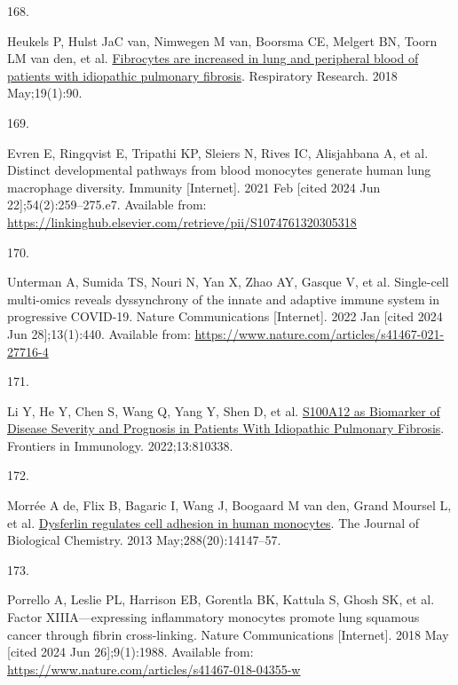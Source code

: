 \documentclass[
]{article}
\newlength{\cslhangindent}
\newlength{\csllabelwidth}
\newenvironment{CSLReferences}[2] %
 {\begin{list}{}{%
  \setlength{\itemindent}{0pt}
  \setlength{\leftmargin}{0pt}
  \setlength{\parsep}{0pt}
  \ifodd #1
   \setlength{\leftmargin}{\cslhangindent}
   \setlength{\itemindent}{-1\cslhangindent}
  \fi
  \setlength{\itemsep}{#2\baselineskip}}}
 {\end{list}}
\newcommand{\CSLLeftMargin}[1]{\parbox[t]{\csllabelwidth}{\strut#1\strut}}
\newcommand{\CSLRightInline}[1]{\parbox[t]{\linewidth - \csllabelwidth}{\strut#1\strut}}
\begin{document}
\begin{CSLReferences}{0}{1}
\CSLLeftMargin{168. }%
\CSLRightInline{Heukels P, Hulst JaC van, Nimwegen M van, Boorsma CE, Melgert BN, Toorn LM van den, et al. \href{https://doi.org/10.1186/s12931-018-0798-8}{Fibrocytes are increased in lung and peripheral blood of patients with idiopathic pulmonary fibrosis}. Respiratory Research. 2018 May;19(1):90. }

\CSLLeftMargin{169. }%
\CSLRightInline{Evren E, Ringqvist E, Tripathi KP, Sleiers N, Rives IC, Alisjahbana A, et al. Distinct developmental pathways from blood monocytes generate human lung macrophage diversity. Immunity {[}Internet{]}. 2021 Feb {[}cited 2024 Jun 22{]};54(2):259--275.e7. Available from: \url{https://linkinghub.elsevier.com/retrieve/pii/S1074761320305318}}

\CSLLeftMargin{170. }%
\CSLRightInline{Unterman A, Sumida TS, Nouri N, Yan X, Zhao AY, Gasque V, et al. Single-cell multi-omics reveals dyssynchrony of the innate and adaptive immune system in progressive {COVID}-19. Nature Communications {[}Internet{]}. 2022 Jan {[}cited 2024 Jun 28{]};13(1):440. Available from: \url{https://www.nature.com/articles/s41467-021-27716-4}}

\CSLLeftMargin{171. }%
\CSLRightInline{Li Y, He Y, Chen S, Wang Q, Yang Y, Shen D, et al. \href{https://doi.org/10.3389/fimmu.2022.810338}{{S100A12} as {Biomarker} of {Disease} {Severity} and {Prognosis} in {Patients} {With} {Idiopathic} {Pulmonary} {Fibrosis}}. Frontiers in Immunology. 2022;13:810338. }

\CSLLeftMargin{172. }%
\CSLRightInline{Morrée A de, Flix B, Bagaric I, Wang J, Boogaard M van den, Grand Moursel L, et al. \href{https://doi.org/10.1074/jbc.M112.448589}{Dysferlin regulates cell adhesion in human monocytes}. The Journal of Biological Chemistry. 2013 May;288(20):14147--57. }

\CSLLeftMargin{173. }%
\CSLRightInline{Porrello A, Leslie PL, Harrison EB, Gorentla BK, Kattula S, Ghosh SK, et al. Factor {XIIIA}---expressing inflammatory monocytes promote lung squamous cancer through fibrin cross-linking. Nature Communications {[}Internet{]}. 2018 May {[}cited 2024 Jun 26{]};9(1):1988. Available from: \url{https://www.nature.com/articles/s41467-018-04355-w}}


\end{CSLReferences}
\end{document}
